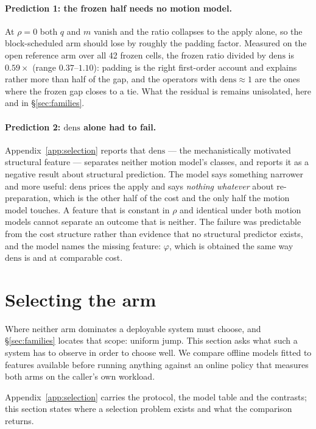 \documentclass{article}
\begin{document}
\paragraph{Prediction 1: the frozen half needs no motion model.}
At $\rho{=}0$ both $q$ and $m$ vanish and the ratio collapses to the apply
alone, so the block-scheduled arm should lose by roughly the padding factor.
Measured on the open reference arm over all 42 frozen cells, the frozen ratio
divided by $\mathrm{dens}$ is $0.59\times$ (range $0.37$--$1.10$): padding is the
right first-order account and explains rather more than half of the gap, and the
operators with $\mathrm{dens}\!\approx\!1$ are the ones where the frozen gap
closes to a tie. What the residual is remains unisolated, here and in
\S\ref{sec:families}.

\paragraph{Prediction 2: \texorpdfstring{$\mathrm{dens}$}{dens} alone had to
fail.} Appendix~\ref{app:selection} reports that $\mathrm{dens}$ --- the
mechanistically motivated structural feature --- separates neither motion
model's classes, and reports it as a negative result about structural
prediction. The model says something narrower and more useful:
$\mathrm{dens}$ prices the apply and says \emph{nothing whatever} about
re-preparation, which is the other half of the cost and the only half the motion
model touches. A feature that is constant in $\rho$ and identical under both
motion models cannot separate an outcome that is neither. The failure was
predictable from the cost structure rather than evidence that no structural
predictor exists, and the model names the missing feature: $\varphi$, which is
obtained the same way $\mathrm{dens}$ is and at comparable cost.

\section{Selecting the arm}
\label{sec:select}

Where neither arm dominates a deployable system must choose, and
\S\ref{sec:families} locates that scope: uniform jump. This section asks what
such a system has to observe in order to choose well. We compare offline
models fitted to features available before running anything against an online
policy that measures both arms on the caller's own workload.

Appendix~\ref{app:selection} carries the protocol, the model table and the
contrasts; this section states where a selection problem exists and what the
comparison returns.
\end{document}
